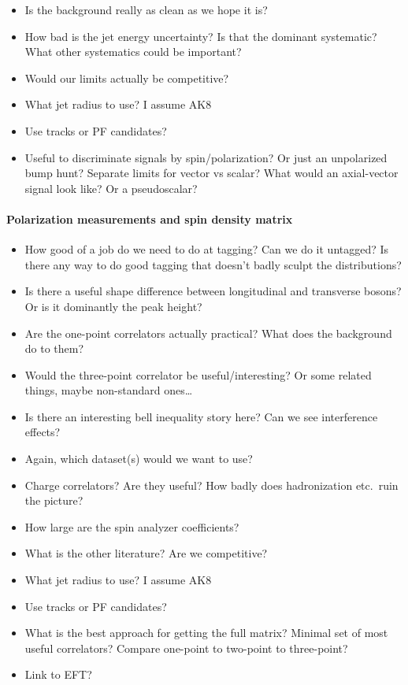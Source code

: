 \documentclass[11pt]{article}
\begin{document}
\begin{itemize}
    \item Is the background really as clean as we hope it is? 
    \item How bad is the jet energy uncertainty? Is that the dominant systematic? What other systematics could be important? 
    \item Would our limits actually be competitive? 
    \item What jet radius to use? I assume AK8
    \item Use tracks or PF candidates?
    \item Useful to discriminate signals by spin/polarization? Or just an unpolarized bump hunt? Separate limits for vector vs scalar? What would an axial-vector signal look like? Or a pseudoscalar? 
\end{itemize}

\paragraph{Polarization measurements and spin density matrix}

\begin{itemize}
    \item How good of a job do we need to do at tagging? Can we do it untagged? Is there any way to do good tagging that doesn't badly sculpt the distributions? 
    \item Is there a useful shape difference between longitudinal and transverse bosons? Or is it dominantly the peak height? 
    \item Are the one-point correlators actually practical? What does the background do to them? 
    \item Would the three-point correlator be useful/interesting? Or some related things, maybe non-standard ones\ldots
    \item Is there an interesting bell inequality story here? Can we see interference effects? 
    \item Again, which dataset(s) would we want to use? 
    \item Charge correlators? Are they useful? How badly does hadronization etc.~ruin the picture? 
    \item How large are the spin analyzer coefficients?
    \item What is the other literature? Are we competitive? 
    \item What jet radius to use? I assume AK8
    \item Use tracks or PF candidates?
    \item What is the best approach for getting the full matrix? Minimal set of most useful correlators? Compare one-point to two-point to three-point? 
    \item Link to EFT?
\end{itemize}
\end{document}
